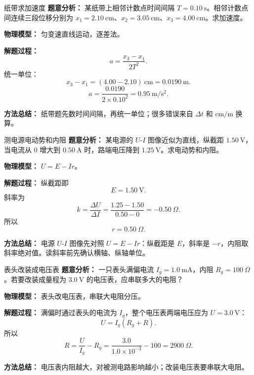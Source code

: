 \begin{examplebox}{纸带求加速度}
\textbf{题意分析：} 某纸带上相邻计数点时间间隔 $T=0.10\ \mathrm{s}$。相邻计数点间连续三段位移分别为 $x_1=2.10\ \mathrm{cm}$、$x_2=3.05\ \mathrm{cm}$、$x_3=4.00\ \mathrm{cm}$。求加速度。

\textbf{物理模型：} 匀变速直线运动，逐差法。

\begin{center}

\end{center}

\textbf{解题过程：}
\[
a=\frac{x_3-x_1}{2T^2}.
\]
统一单位：
\[
x_3-x_1=(4.00-2.10)\ \mathrm{cm}=0.0190\ \mathrm{m}.
\]
\[
a=\frac{0.0190}{2\times0.10^2}=0.95\ \mathrm{m/s^2}.
\]

\textbf{方法总结：} 纸带题先数时间间隔，再统一单位；很多错误来自 $\Delta t$ 和 $\mathrm{cm}/\mathrm{m}$ 换算。
\end{examplebox}

\begin{examplebox}{测电源电动势和内阻}
\textbf{题意分析：} 某电源的 $U$-$I$ 图像近似为直线，纵截距 $1.50\ \mathrm{V}$，当电流从 $0$ 增大到 $0.50\ \mathrm{A}$ 时，路端电压降到 $1.25\ \mathrm{V}$。求电动势和内阻。

\textbf{物理模型：} $U=E-Ir$。

\begin{center}

\end{center}

\textbf{解题过程：}
纵截距即
\[
E=1.50\ \mathrm{V}.
\]
斜率为
\[
k=\frac{\Delta U}{\Delta I}=\frac{1.25-1.50}{0.50-0}=-0.50\ \Omega.
\]
所以
\[
r=0.50\ \Omega.
\]

\textbf{方法总结：} 电源 $U$-$I$ 图像先对照 $U=E-Ir$：纵截距是 $E$，斜率是 $-r$，内阻取斜率绝对值。读斜率前先确认横轴、纵轴单位。
\end{examplebox}

\begin{examplebox}{表头改装成电压表}
\textbf{题意分析：} 一只表头满偏电流 $I_g=1.0\ \mathrm{mA}$，内阻 $R_g=100\ \Omega$。若要改装成量程为 $3.0\ \mathrm{V}$ 的电压表，应串联多大的电阻？

\textbf{物理模型：} 表头改电压表，串联大电阻分压。

\begin{center}

\end{center}

\textbf{解题过程：}
满偏时通过表头的电流为 $I_g$，整个电压表两端电压应为 $U=3.0\ \mathrm{V}$：
\[
U=I_g(R_g+R).
\]
所以
\[
R=\frac{U}{I_g}-R_g
=\frac{3.0}{1.0\times10^{-3}}-100
=2900\ \Omega.
\]

\textbf{方法总结：} 电压表内阻越大，对被测电路影响越小；改装电压表要串联大电阻。
\end{examplebox}

